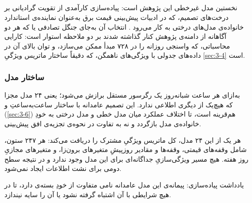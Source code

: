 
\subsection{}
\label{sec:3-7-1}

نخستین مدل غیرخطی این پژوهش  است: پیاده‌سازی کارآمدی از تقویت گرادیانی
بر درخت‌های تصمیم، که در ادبیات پیش‌بینی قیمت برق به‌عنوان نماینده‌ی استاندارد
خانواده‌ی مدل‌های درختی به کار می‌رود \cite{jiang_review_2018, oconnor_review_2025}.
انتخاب آن  به‌جای جنگل تصادفی یا  که هر دو آگاهانه از دامنه‌ی پژوهش
کنار گذاشته شدند  بر دو ملاحظه استوار است: کارایی محاسباتی، که واسنجی روزانه
را در ۷۲۸ مبدأ ممکن می‌سازد، و توان بالای آن در داده‌های جدولی با ویژگی‌های ناهمگن،
که دقیقاً ساختار ماتریس ویژگیِ \cref{sec:3-4} است.

\subsubsection*{ساختار مدل}

به‌ازای هر ساعت شبانه‌روز یک رگرسور مستقل برازش می‌شود؛ یعنی ۲۴ مدل مجزا که هیچ‌یک
از دیگری اطلاعی ندارد. این تصمیم عامدانه با ساختار ساعت‌به‌ساعتِ  و
 (\cref{sec:3-6}) هم‌قرینه است، تا اختلاف عملکرد میان مدل خطی و مدل درختی به
خودِ خانواده‌ی مدل بازگردد و نه به تفاوت در نحوه‌ی تجزیه‌ی افق پیش‌بینی.

هر یک از این ۲۴ مدل، کل ماتریس ویژگیِ مشترک را دریافت می‌کند: هر ۲۴۷ ستون، شامل
وقفه‌های قیمتی، وقفه‌ها و مقادیر روزپیشِ متغیرهای برون‌زا، و متغیرهای مجازیِ روز
هفته. هیچ مسیر ویژگی‌سازیِ جداگانه‌ای برای این مدل وجود ندارد و در نتیجه سطح دومی
برای نشت اطلاعات ایجاد نمی‌شود.

یادداشت پیاده‌سازی: پیمانه‌ی این مدل عامدانه نامی متفاوت از خودِ بسته‌ی 
دارد، تا در هیچ شرایطی با آن اشتباه گرفته نشود یا آن را سایه نیندازد.

